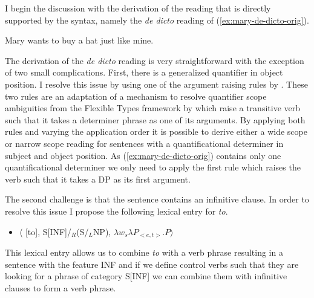 \documentclass[parskip=half]{scrartcl}
\begin{document}
I begin the discussion with the derivation of the reading that is directly supported by the syntax, namely the \textit{de dicto} reading of (\ref{ex:mary-de-dicto-orig}).

\begin{exe}
\ex \label{ex:mary-de-dicto-orig}Mary wants to buy a hat just like mine.
\end{exe}

The derivation of the \textit{de dicto} reading is very straightforward with the exception of two small complications. First, there is a generalized quantifier in object position. 
I resolve this issue by using one of the argument raising rules by \cite{barker2005}. These two rules are an adaptation of a mechanism to resolve quantifier scope ambiguities from the Flexible Types framework by \cite{hendriks1993} which raise a transitive verb such that it takes a determiner phrase as one of its arguments. By applying both rules and varying the application order it is possible to derive either a wide scope or narrow scope reading for sentences with a quantificational determiner in subject and object position. As (\ref{ex:mary-de-dicto-orig}) contains only one quantificational determiner we only need to apply the first rule which raises the verb such that it takes a DP as its first argument. 


The second challenge is that the sentence contains an infinitive clause. In order to resolve this issue I propose the following lexical entry for \textit{to}.

\begin{itemize}
\item $\langle$ [to], S[INF]/$_R$(S/$_L$NP), $\lambda w_s \lambda P_{<e,t>}. P \rangle$
\end{itemize}

This lexical entry allows us to combine \textit{to} with a verb phrase resulting in a sentence with the feature INF and if we define control verbs such that they are looking for a phrase of category S[INF] we can combine them with infinitive clauses to form a verb phrase.

\end{document}
